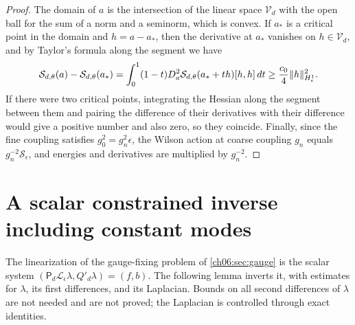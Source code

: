 \begin{proof}
The domain of $a$ is the intersection of the linear space $\mathcal V_d$ with the open ball for the sum of a norm and a seminorm, which is convex. If $a_*$ is a critical point in the domain and $h=a-a_*$, then the derivative at $a_*$ vanishes on $h\in\mathcal V_d$, and by Taylor's formula along the segment we have
\[
 \mathcal S_{d,\theta}(a)-\mathcal S_{d,\theta}(a_*)=\int_0^1(1-t)D_a^2\mathcal S_{d,\theta}(a_*+th)[h,h]\,dt\ge\frac{c_0}4\lVert h\rVert_{H^1_\epsilon}^2.
\]
If there were two critical points, integrating the Hessian along the segment between them and pairing the difference of their derivatives with their difference would give a positive number and also zero, so they coincide. Finally, since the fine coupling satisfies $g_0^2=g_n^2\epsilon$, the Wilson action at coarse coupling $g_n$ equals $g_n^{-2}\mathscr S_\epsilon$, and energies and derivatives are multiplied by $g_n^{-2}$.
\end{proof}

\section{A scalar constrained inverse including constant modes}\label{ch06:sec:scalar}

The linearization of the gauge-fixing problem of \cref{ch06:sec:gauge} is the scalar system $(\mathsf P_d\mathscr L_\epsilon\lambda,Q'_d\lambda)=(f,b)$. The following lemma inverts it, with estimates for $\lambda$, its first differences, and its Laplacian. Bounds on all second differences of $\lambda$ are not needed and are not proved; the Laplacian is controlled through exact identities.

